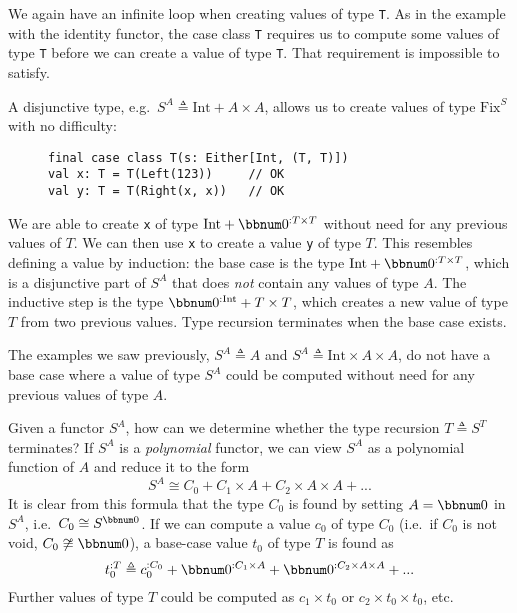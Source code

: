 \noindent We again have an infinite loop when creating values of type
\lstinline!T!. As in the example with the identity functor, the case
class \lstinline!T! requires us to compute some values of type \lstinline!T!
before we can create a value of type \lstinline!T!. That requirement
is impossible to satisfy.

A disjunctive type, e.g.~$S^{A}\triangleq\text{Int}+A\times A$,
allows us to create values of type $\text{Fix}^{S}$ with no difficulty:

\begin{wrapfigure}{l}{0.46\columnwidth}%
\vspace{-0.75\baselineskip}
\begin{lstlisting}
final case class T(s: Either[Int, (T, T)])
val x: T = T(Left(123))     // OK
val y: T = T(Right(x, x))   // OK
\end{lstlisting}

\vspace{-1\baselineskip}
\end{wrapfigure}%

\noindent We are able to create \lstinline!x! of type $\text{Int}+\bbnum 0^{:T\times T}$
without need for any previous values of $T$. We can then use \lstinline!x!
to create a value \lstinline!y! of type $T$. This resembles defining
a value by induction: the base case is the type $\text{Int}+\bbnum 0^{:T\times T}$,
which is a disjunctive part of $S^{A}$ that does \emph{not} contain
any values of type $A$. The inductive step is the type $\bbnum 0^{:\text{Int}}+T\times T$,
which creates a new value of type $T$ from two previous values. Type
recursion terminates when the base case exists.

The examples we saw previously, $S^{A}\triangleq A$ and $S^{A}\triangleq\text{Int}\times A\times A$,
do not have a base case where a value of type $S^{A}$ could be computed
without need for any previous values of type $A$. 

Given a functor $S^{A}$, how can we determine whether the type recursion
$T\triangleq S^{T}$ terminates? If $S^{A}$ is a \emph{polynomial}
functor, we can view $S^{A}$ as a polynomial function of $A$ and
reduce it to the form 
\begin{equation}
S^{A}\cong C_{0}+C_{1}\times A+C_{2}\times A\times A+...\label{eq:functor-polynomial-normal-form}
\end{equation}
It is clear from this formula that the type $C_{0}$ is found by setting
$A=\bbnum 0$ in $S^{A}$, i.e.~$C_{0}\cong S^{\bbnum 0}$. If we
can compute a value $c_{0}$ of type $C_{0}$ (i.e.~if $C_{0}$ is
not void, $C_{0}\not\cong\bbnum 0$), a base-case value $t_{0}$ of
type $T$ is found as
\[
t_{0}^{:T}\triangleq c_{0}^{:C_{0}}+\bbnum 0^{:C_{1}\times A}+\bbnum 0^{:C_{2}\times A\times A}+...
\]
Further values of type $T$ could be computed as $c_{1}\times t_{0}$
or $c_{2}\times t_{0}\times t_{0}$, etc.

